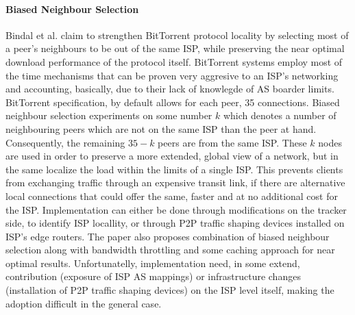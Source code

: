 \paragraph*{\bf Biased Neighbour Selection}
Bindal et al. \cite{rpc_bitbiased_2006} claim to strengthen BitTorrent
protocol\cite{c_bittorrent_2003} locality by selecting most of a peer's
neighbours to be out of the same ISP, while preserving the near optimal download
performance of the protocol itself. BitTorrent systems employ most of the time
mechanisms that can be proven very aggresive to an ISP's networking and
accounting, basically, due to their lack of knowlegde of AS boarder limits.
BitTorrent specification, by default allows for each peer, 35 connections.
Biased neighbour selection experiments on some number $k$ which denotes a number
of neighbouring peers which are not on the same ISP than the peer at hand.
Consequently, the remaining $35 - k$ peers are from the same ISP. These $k$
nodes are used in order to preserve a more extended, global view of a network,
but in the same localize the load within the limits of a single ISP. This
prevents clients from exchanging traffic through an expensive transit link, if
there are alternative local connections that could offer the same, faster and at
no additional cost for the ISP. Implementation can either be done through
modifications on the tracker side, to identify ISP locallity, or through P2P
traffic shaping devices installed on ISP's edge routers. The paper also proposes
combination of biased neighbour selection along with bandwidth throttling and
some caching approach for near optimal results. Unfortunatelly, implementation
need, in some extend, contribution (exposure of ISP AS mappings) or
infrastructure changes (installation of P2P traffic shaping devices) on the ISP
level itself, making the adoption difficult in the general case.

